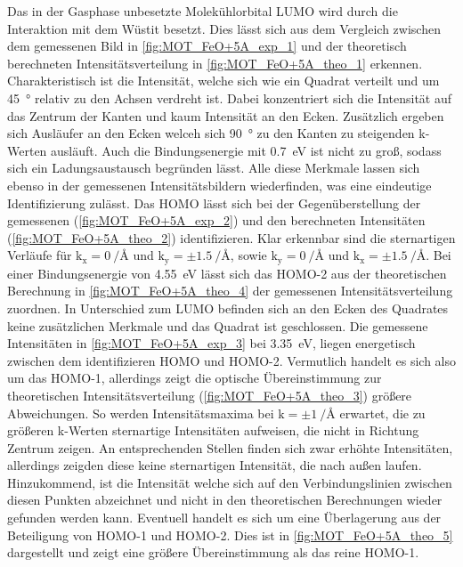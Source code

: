         Das in der Gasphase unbesetzte Molekühlorbital LUMO wird durch die Interaktion mit dem Wüstit besetzt.
        Dies lässt sich aus dem Vergleich zwischen dem gemessenen Bild in \autoref{fig:MOT_FeO+5A_exp_1} und der theoretisch berechneten Intensitätsverteilung in \autoref{fig:MOT_FeO+5A_theo_1} erkennen.
        Charakteristisch ist die Intensität, welche sich wie ein Quadrat verteilt und um \SI{45}{\degree} relativ zu den Achsen verdreht ist.
        Dabei konzentriert sich die Intensität auf das Zentrum der Kanten und kaum Intensität an den Ecken.
        Zusätzlich ergeben sich Ausläufer an den Ecken welceh sich \SI{90}{\degree} zu den Kanten zu steigenden k-Werten ausläuft.
        Auch die Bindungsenergie mit \SI{0.7}{\electronvolt} ist nicht zu groß, sodass sich ein Ladungsaustausch begründen lässt.
        Alle diese Merkmale lassen sich ebenso in der gemessenen Intensitätsbildern wiederfinden, was eine eindeutige Identifizierung zulässt.
        Das HOMO lässt sich bei der Gegenüberstellung der gemessenen (\autoref{fig:MOT_FeO+5A_exp_2}) und den berechneten Intensitäten (\autoref{fig:MOT_FeO+5A_theo_2}) identifizieren.
        Klar erkennbar sind die sternartigen Verläufe für $\text{k}_\text{x} = \SI{0}{\per\angstrom}$ und $\text{k}_\text{y} = \pm\SI{1.5}{\per\angstrom}$, sowie $\text{k}_\text{y} = \SI{0}{\per\angstrom}$ und $\text{k}_\text{x} = \pm\SI{1.5}{\per\angstrom}$.
        Bei einer Bindungsenergie von \SI{4.55}{\electronvolt} lässt sich das HOMO-2 aus der theoretischen Berechnung in \autoref{fig:MOT_FeO+5A_theo_4} der gemessenen Intensitätsverteilung zuordnen.
        In Unterschied zum LUMO befinden sich an den Ecken des Quadrates keine zusätzlichen Merkmale und das Quadrat ist geschlossen.
        Die gemessene Intensitäten in \autoref{fig:MOT_FeO+5A_exp_3} bei \SI{3.35}{\electronvolt}, liegen energetisch zwischen dem identifizieren HOMO und HOMO-2.
        Vermutlich handelt es sich also um das HOMO-1, allerdings zeigt die optische Übereinstimmung zur theoretischen Intensitätsverteilung (\autoref{fig:MOT_FeO+5A_theo_3}) größere Abweichungen.
        So werden Intensitätsmaxima bei $\text{k} = \pm\SI{1}{\per\angstrom}$ erwartet, die zu größeren k-Werten sternartige Intensitäten aufweisen, die nicht in Richtung Zentrum zeigen.
        An entsprechenden Stellen finden sich zwar erhöhte Intensitäten, allerdings zeigden diese keine sternartigen Intensität, die nach außen laufen.
        Hinzukommend, ist die Intensität welche sich auf den Verbindungslinien zwischen diesen Punkten abzeichnet und nicht in den theoretischen Berechnungen wieder gefunden werden kann.
        Eventuell handelt es sich um eine Überlagerung aus der Beteiligung von HOMO-1 und HOMO-2.
        Dies ist in \autoref{fig:MOT_FeO+5A_theo_5} dargestellt und zeigt eine größere Übereinstimmung als das reine HOMO-1.

